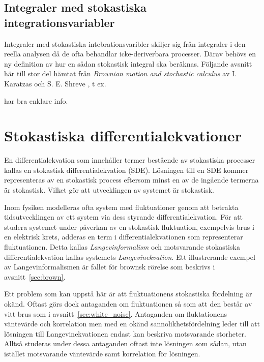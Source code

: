 \subsection{Integraler med stokastiska integrationsvariabler}
\label{sec:Stok_int}

Integraler med stokastiska intebrationsvaribler skiljer sig från integraler i den reella analysen då de ofta behandlar icke-deriverbara processer. Därav behövs en ny definition av hur en sådan stokastisk integral ska beräknas. Följande avsnitt här till stor del hämtat från \textit{Brownian motion and stochastic calculus} av I. Karatzas och S. E. Shreve \cite{Karatzas_stokint1991}, t ex.

\cite{Dieker_fBm} har bra enklare info.


\section{Stokastiska differentialekvationer}
En differentialekvation som innehåller termer bestående av stokastiska
processer kallas en stokastisk differentialekvation (SDE). Lösningen
till en SDE kommer representeras av en stokastisk process eftersom
minst en av de ingående termerna är stokastisk. Vilket gör att utvecklingen av systemet är stokastisk.

Inom fysiken modelleras ofta system med fluktuationer genom
att betrakta tidsutvecklingen av ett system via dess styrande
differentialekvation. 
För att studera systemet under påverkan av en stokastisk fluktuation,
exempelvis brus i en elektrisk krets, adderas en term i
differentialekvationen som representerar fluktuationen. 
Detta kallas \emph{Langevinformalism} och motsvarande stokastiska
differentialekvation kallas systemets \emph{Langevinekvation}. 
Ett illustrerande exempel av Langevinformalismen är fallet för
brownsk rörelse som beskrivs i avsnitt~\ref{sec:brown}.

Ett problem som kan uppstå här är att fluktuationens stokastiska fördelning är okänd. Oftast görs dock antaganden om fluktuationen så som att den består av vitt brus som i avsnitt~\ref{sec:white_noise}. 
Antaganden om fluktationens väntevärde och korrelation men med en okänd sannolikhetsfördelning leder till att lösningen till Langevinekvationen endast kan beskriva motsvarande storheter. Alltså studeras under dessa antaganden oftast inte lösningen som sådan, utan istället motsvarande väntevärde samt korrelation för lösningen.  






